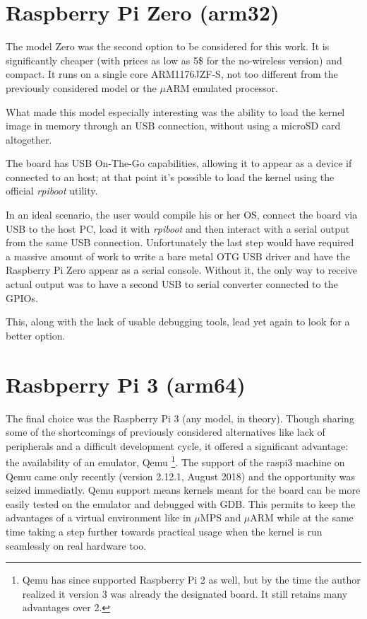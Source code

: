 \documentclass[12pt,a4paper,openright,twoside]{report}
\begin{document}
\section{Raspberry Pi Zero (arm32)}
The model Zero was the second option to be considered for this work. It is 
significantly cheaper (with prices as low as 5\$ for the no-wireless version)
and compact. It runs on a single core ARM1176JZF-S, not too different from
the previously considered model or the $\mu$ARM emulated processor.

What made this model especially interesting was the ability to load the kernel
image in memory through an USB connection, without using a microSD card altogether.

The board has USB On-The-Go capabilities, allowing it to appear as a device if connected
to an host; at that point it's possible to load the kernel using the official
 \textit{rpiboot} utility.

In an ideal scenario, the user would compile his or her OS, connect the board
via USB to the host PC, load it with \textit{rpiboot} and then interact with a
serial output from the same USB connection.
Unfortunately the last step would have required a massive amount of work to write
a bare metal OTG USB driver and have the Raspberry Pi Zero appear as a serial 
console. Without it, the only way to receive actual output was to have a second
USB to serial converter connected to the GPIOs.

This, along with the lack of usable debugging tools, lead yet again to look for
a better option.

\section{Rasbperry Pi 3 (arm64)}
The final choice was the Raspberry Pi 3 (any model, in theory). Though sharing
some of the shortcomings of previously considered alternatives like lack of 
peripherals and a difficult development cycle, it offered a significant advantage:
the availability of an emulator, Qemu \footnote{Qemu has since supported Raspberry Pi 2
as well, but by the time the author realized it version 3 was already the designated
board. It still retains many advantages over 2.}.
The support of the raspi3 machine on Qemu came only recently (version 2.12.1, August 2018)
and the opportunity was seized immediatly. Qemu support means kernels meant for
the board can be more easily tested on the emulator and debugged with GDB.
This permits to keep the advantages of a virtual environment like in $\mu$MPS and
$\mu$ARM while at the same time taking a step further towards practical usage
when the kernel is run seamlessly on real hardware too.
\end{document}
